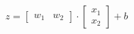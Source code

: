\documentclass[preview]{standalone}
\begin{document}
\begin{align*}
z = \begin{bmatrix} w_1 & w_2 \end{bmatrix} \cdot \begin{bmatrix} x_1 \\ x_2 \end{bmatrix} + b
\end{align*}
\end{document}
